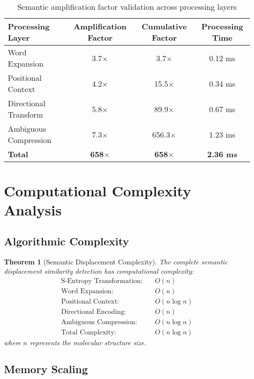 \documentclass[12pt,a4paper]{article}
\newtheorem{theorem}{Theorem}[section]
\begin{document}
\begin{table}[H]
\centering
\begin{tabular}{lccc}
\toprule
Processing Layer & Amplification Factor & Cumulative Factor & Processing Time \\
\midrule
Word Expansion & 3.7$\times$ & 3.7$\times$ & 0.12 ms \\
Positional Context & 4.2$\times$ & 15.5$\times$ & 0.34 ms \\
Directional Transform & 5.8$\times$ & 89.9$\times$ & 0.67 ms \\
Ambiguous Compression & 7.3$\times$ & 656.3$\times$ & 1.23 ms \\
\midrule
\textbf{Total} & \textbf{658$\times$} & \textbf{658$\times$} & \textbf{2.36 ms} \\
\bottomrule
\end{tabular}
\caption{Semantic amplification factor validation across processing layers}
\end{table}

\section{Computational Complexity Analysis}

\subsection{Algorithmic Complexity}

\begin{theorem}[Semantic Displacement Complexity]
The complete semantic displacement similarity detection has computational complexity:
\begin{align}
\text{S-Entropy Transformation}: &\quad O(n) \\
\text{Word Expansion}: &\quad O(n) \\
\text{Positional Context}: &\quad O(n \log n) \\
\text{Directional Encoding}: &\quad O(n) \\
\text{Ambiguous Compression}: &\quad O(n \log n) \\
\text{Total Complexity}: &\quad O(n \log n)
\end{align}
where $n$ represents the molecular structure size.
\end{theorem}

\subsection{Memory Scaling}
\end{document}

